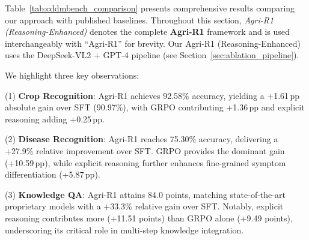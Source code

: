 \documentclass[sigconf,anonymous,review]{acmart}
\begin{document}
Table~\ref{tab:cddmbench_comparison} presents comprehensive results comparing our approach with published baselines. Throughout this section, \textit{Agri-R1 (Reasoning-Enhanced)} denotes the complete \textbf{Agri-R1} framework and is used interchangeably with ``Agri-R1'' for brevity. Our Agri-R1 (Reasoning-Enhanced) uses the DeepSeek-VL2 + GPT-4 pipeline (see Section~\ref{sec:ablation_pipeline}).

We highlight three key observations:

(1) \textbf{Crop Recognition}: Agri-R1 achieves 92.58\% accuracy, yielding a +1.61\,pp absolute gain over SFT (90.97\%), with GRPO contributing +1.36\,pp and explicit reasoning adding +0.25\,pp.

(2) \textbf{Disease Recognition}: Agri-R1 reaches 75.30\% accuracy, delivering a +27.9\% relative improvement over SFT. GRPO provides the dominant gain (+10.59\,pp), while explicit reasoning further enhances fine-grained symptom differentiation (+5.87\,pp).

(3) \textbf{Knowledge QA}: Agri-R1 attains 84.0 points, matching state-of-the-art proprietary models with a +33.3\% relative gain over SFT. Notably, explicit reasoning contributes more (+11.51 points) than GRPO alone (+9.49 points), underscoring its critical role in multi-step knowledge integration.
\end{document}

